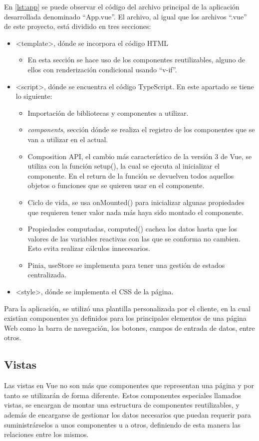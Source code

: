 En \ref{lst:app} se puede observar el código del archivo principal de la aplicación desarrollada denominado ``App.vue''. El archivo, al igual que los archivos ``.vue'' de este proyecto, está dividido en tres secciones:
\begin{itemize}
\item <template>, dónde se incorpora el código HTML
\begin{itemize}
\item En esta sección se hace uso de los componentes reutilizables, alguno de ellos con renderización condicional usando ``v-if''.
\end{itemize}
\item <script>, dónde se encuentra el código TypeScript. En este apartado se tiene lo siguiente:
\begin{itemize}
\item Importación de bibliotecas y componentes a utilizar.
\item \textit{components}, sección dónde se realiza el registro de los componentes que se van a utilizar en el actual.
\item Composition API, el cambio más característico de la versión 3 de Vue, se utiliza con la función setup(), la cual se ejecuta al inicializar el componente. En el return de la función se devuelven todos aquellos objetos o funciones que se quieren usar en el componente.
\item Ciclo de vida, se usa onMounted() para inicializar algunas propiedades que requieren tener valor nada más haya sido montado el componente.
\item Propiedades computadas, computed() cachea los datos hasta que los valores de las variables reactivas con las que se conforma no cambien. Esto evita realizar cálculos innecesarios.
\item Pinia, useStore se implementa para tener una gestión de estados centralizada.
\end{itemize}
\item <style>, dónde se implementa el CSS de la página.
\end{itemize}

Para la aplicación, se utilizó una plantilla personalizada por el cliente, en la cual existían componentes ya definidos para los principales elementos de una página Web como la barra de navegación, los botones, campos de entrada de datos, entre otros.

\subsection{Vistas}
Las vistas en Vue no son más que componentes que representan una página y por tanto se utilizarán de forma diferente. Estos componentes especiales llamados vistas, se encargan de montar una estructura de componentes reutilizables, y además de encargarse de gestionar los datos necesarios que puedan requerir para suministrárselos a unos componentes u a otros, definiendo de esta manera las relaciones entre los mismos.

